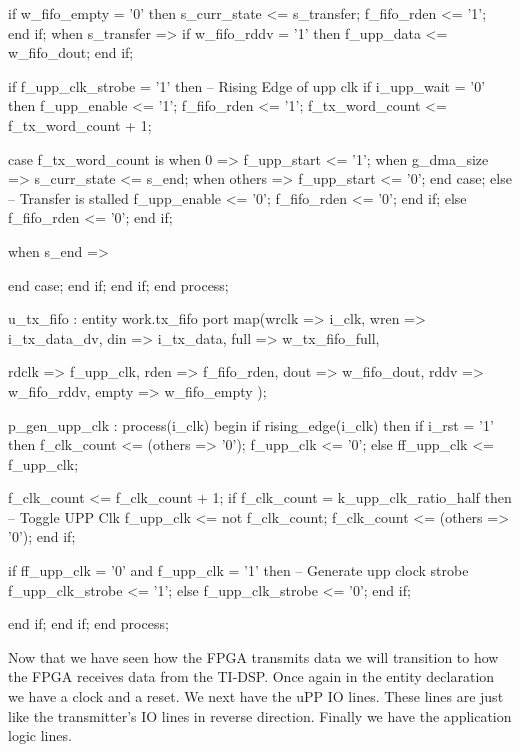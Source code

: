 \begin{VHDLlisting}[tabsize=2]
						if w_fifo_empty = '0' then
							s_curr_state <= s_transfer;
							f_fifo_rden <= '1';
						end if;					
					when s_transfer => 
						if w_fifo_rddv = '1' then
							f_upp_data <= w_fifo_dout;
						end if;
						
						if f_upp_clk_strobe = '1' then
							-- Rising Edge of upp clk
							if i_upp_wait = '0' then
								f_upp_enable <= '1';
								f_fifo_rden <= '1';
								f_tx_word_count <= f_tx_word_count + 1;
							
								case f_tx_word_count is
									when 0 => 
										f_upp_start <= '1';
									when g_dma_size => 
										s_curr_state <= s_end;
									when others =>
										f_upp_start <= '0';
								end case;			
							else
								-- Transfer is stalled
								f_upp_enable <= '0';
								f_fifo_rden <= '0';
							end if;							
						else
							f_fifo_rden <= '0';
						end if;
					
					when s_end => 
				
				end case;
			end if;
		end if;
	end process;
	
	
	u_tx_fifo : entity work.tx_fifo
	port map(wrclk => i_clk, 
			 wren  => i_tx_data_dv,
			 din   => i_tx_data,
			 full  => w_tx_fifo_full,
	
			 rdclk => f_upp_clk,
			 rden  => f_fifo_rden,
			 dout  => w_fifo_dout,
			 rddv  => w_fifo_rddv,
			 empty => w_fifo_empty	
	);
	
	p_gen_upp_clk : process(i_clk)
	begin
		if rising_edge(i_clk) then
			if i_rst = '1' then
				f_clk_count <= (others => '0');
				f_upp_clk <= '0';
			else
				ff_upp_clk <= f_upp_clk;
			
				f_clk_count <= f_clk_count + 1;
				if f_clk_count = k_upp_clk_ratio_half then
					-- Toggle UPP Clk
					f_upp_clk <= not f_clk_count;
					f_clk_count <= (others => '0');
				end if;
				
				if ff_upp_clk = '0' and f_upp_clk = '1' then
					-- Generate upp clock strobe
					f_upp_clk_strobe <= '1';
				else
					f_upp_clk_strobe <= '0';
				end if;
				
			end if;
		end if;	
	end process;
\end{VHDLlisting}

Now that we have seen how the \ac{FPGA} transmits data we will transition to how the \ac{FPGA} receives data from the \ac{TI}-\ac{DSP}. Once again in the entity declaration we have a clock and a reset. We next have the \ac{uPP} \ac{IO} lines. These lines are just like the transmitter's \ac{IO} lines in reverse direction. Finally we have the application logic lines. 

